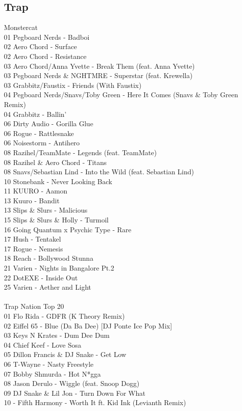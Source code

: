 \begin{multicols}{2}
\subsection*{Trap}
\large Monstercat \normalsize\\
 01 Pegboard Nerds - Badboi\\ 02 Aero Chord - Surface\\ 02 Aero Chord - Resistance\\ 03 Aero Chord/Anna Yvette - Break Them (feat. Anna Yvette)\\ 03 Pegboard Nerds \& NGHTMRE - Superstar (feat. Krewella)\\ 03 Grabbitz/Faustix - Friends (With Faustix)\\ 04 Pegboard Nerds/Snavs/Toby Green - Here It Comes (Snavs \& Toby Green Remix)\\ 04 Grabbitz - Ballin'\\ 06 Dirty Audio - Gorilla Glue\\ 06 Rogue - Rattlesnake\\ 06 Noisestorm - Antihero\\ 08 Razihel/TeamMate - Legends (feat. TeamMate)\\ 08 Razihel \& Aero Chord - Titans\\ 08 Snavs/Sebastian Lind - Into the Wild (feat. Sebastian Lind)\\ 10 Stonebank - Never Looking Back\\ 11 KUURO - Aamon\\ 13 Kuuro - Bandit\\ 13 Slips \& Slurs - Malicious\\ 15 Slips \& Slurs \& Holly - Turmoil\\ 16 Going Quantum x Psychic Type - Rare\\ 17 Hush - Tentakel\\ 17 Rogue - Nemesis\\ 18 Reach - Bollywood Stunna\\ 21 Varien - Nights in Bangalore Pt.2\\ 22 DotEXE - Inside Out\\ 25 Varien - Aether and Light\\
\\ \large Trap Nation Top 20 \normalsize\\
 01 Flo Rida - GDFR (K Theory Remix)\\ 02 Eiffel 65 - Blue (Da Ba Dee) [DJ Ponte Ice Pop Mix]\\ 03 Keys N Krates - Dum Dee Dum\\ 04 Chief Keef - Love Sosa\\ 05 Dillon Francis \& DJ Snake - Get Low\\ 06 T-Wayne - Nasty Freestyle\\ 07 Bobby Shmurda - Hot N*gga\\ 08 Jason Derulo - Wiggle (feat. Snoop Dogg)\\ 09 DJ Snake \& Lil Jon - Turn Down For What\\ 10  - Fifth Harmony - Worth It ft. Kid Ink (Levianth Remix)\\

\end{multicols}
